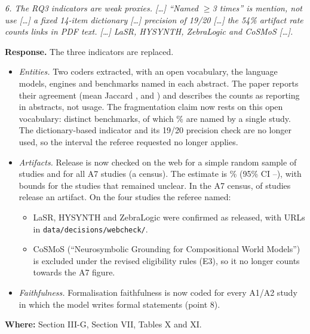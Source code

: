 \documentclass[10pt,a4paper]{article}
\newenvironment{referee}{\par\medskip\noindent\begin{minipage}{\linewidth}\color{black!65}\itshape}{\end{minipage}\par\smallskip}
\newcommand{\resp}{\noindent\textbf{Response.} }
\newcommand{\where}[1]{\par\noindent\textbf{Where:} #1\par}
\begin{document}
\begin{referee}
6. The RQ3 indicators are weak proxies. [\ldots] ``Named $\geq$3 times'' is mention, not use [\ldots] a fixed 14-item dictionary [\ldots] precision of 19/20 [\ldots] the 54\% artifact rate counts links in PDF text. [\ldots] LaSR, HYSYNTH, ZebraLogic and CoSMoS [\ldots].
\end{referee}
\resp The three indicators are replaced.
\begin{itemize}
  \item \emph{Entities.} Two coders extracted, with an open vocabulary, the language models, engines and benchmarks named in each abstract. The paper reports their agreement (mean Jaccard ,  and ) and describes the counts as reporting in abstracts, not usage. The fragmentation claim now rests on this open vocabulary:  distinct benchmarks, of which \% are named by a single study. The dictionary-based indicator and its 19/20 precision check are no longer used, so the interval the referee requested no longer applies.
  \item \emph{Artifacts.} Release is now checked on the web for a simple random sample of  studies and for all A7 studies (a census). The estimate is \% (95\% CI --), with bounds for the  studies that remained unclear. In the A7 census,  of  studies release an artifact. On the four studies the referee named:
  \begin{itemize}
    \item LaSR, HYSYNTH and ZebraLogic were confirmed as released, with URLs in \texttt{data/decisions/webcheck/}.
    \item CoSMoS (``Neurosymbolic Grounding for Compositional World Models'') is excluded under the revised eligibility rules (E3), so it no longer counts towards the A7 figure.
  \end{itemize}
  \item \emph{Faithfulness.} Formalisation faithfulness is now coded for every A1/A2 study in which the model writes formal statements (point 8).
\end{itemize}
\where{Section III-G, Section VII, Tables X and XI.}
\end{document}
